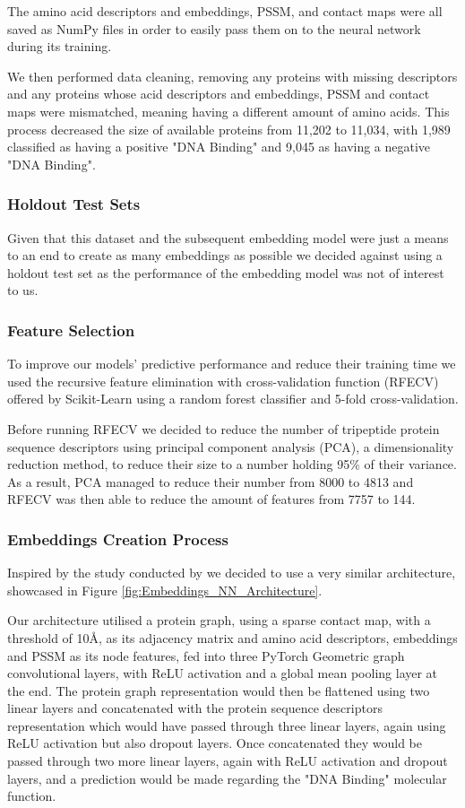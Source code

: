 The amino acid descriptors and embeddings, PSSM, and contact maps were all saved as NumPy files in order to easily pass them on to the neural network during its training.

We then performed data cleaning, removing any proteins with missing descriptors and any proteins whose acid descriptors and embeddings, PSSM and contact maps were mismatched, meaning having a different amount of amino acids. This process decreased the size of available proteins from 11,202 to 11,034, with 1,989 classified as having a positive "DNA Binding" and 9,045 as having a negative "DNA Binding".

\subsubsection{Holdout Test Sets}

Given that this dataset and the subsequent embedding model were just a means to an end to create as many embeddings as possible we decided against using a holdout test set as the performance of the embedding model was not of interest to us.

\subsubsection{Feature Selection}

To improve our models' predictive performance and reduce their training time we used the recursive feature elimination with cross-validation function (RFECV) offered by Scikit-Learn \citep{scikit-learn} using a random forest classifier and 5-fold cross-validation.

Before running RFECV we decided to reduce the number of tripeptide protein sequence descriptors using principal component analysis (PCA), a dimensionality reduction method, to reduce their size to a number holding 95\% of their variance. As a result, PCA managed to reduce their number from 8000 to 4813 and RFECV was then able to reduce the amount of features from 7757 to 144.

\subsubsection{Embeddings Creation Process}

Inspired by the study conducted by \citet{Jiang2020} we decided to use a very similar architecture, showcased in Figure \ref{fig:Embeddings_NN_Architecture}.

Our architecture utilised a protein graph, using a sparse contact map, with a threshold of 10\AA {}, as its adjacency matrix and amino acid descriptors, embeddings and PSSM as its node features, fed into three PyTorch Geometric graph convolutional layers, with ReLU activation and a global mean pooling layer at the end. The protein graph representation would then be flattened using two linear layers and concatenated with the protein sequence descriptors representation which would have passed through three linear layers, again using ReLU activation but also dropout layers. Once concatenated they would be passed through two more linear layers, again with ReLU activation and dropout layers, and a prediction would be made regarding the "DNA Binding" molecular function.

